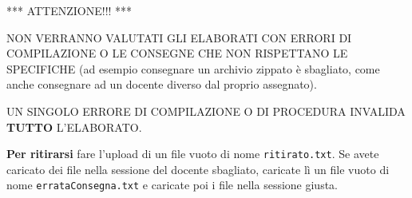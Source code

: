 \documentclass[a4paper]{article}
\begin{document}
\hrulefill

\begin{center}*** ATTENZIONE!!! ***\end{center}

NON VERRANNO VALUTATI GLI ELABORATI CON ERRORI DI COMPILAZIONE O 
LE CONSEGNE CHE NON RISPETTANO LE SPECIFICHE (ad esempio consegnare un 
archivio zippato è sbagliato, come anche consegnare ad un docente diverso dal 
proprio assegnato).

UN SINGOLO ERRORE DI COMPILAZIONE O DI PROCEDURA INVALIDA 
\textbf{TUTTO} 
L'ELABORATO.
\medskip

\hrulefill

{\bf Per ritirarsi}
fare l'upload di un file vuoto di nome  \texttt{ritirato.txt}. Se avete caricato 
dei file nella sessione del docente sbagliato, caricate lì un file vuoto di 
nome  \texttt{errataConsegna.txt} e caricate poi i file nella sessione giusta. 

\hrulefill

\end{document}
